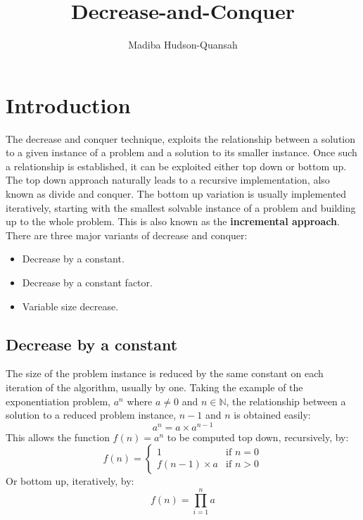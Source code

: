 \documentclass[12pt letter]{report}
\title{\Huge{Decrease-and-Conquer}}
\author{\huge{Madiba Hudson-Quansah}}
\date{}
\begin{document}
\maketitle
\newpage
{}
\tableofcontents
\pagebreak

\chapter{Introduction}

The decrease and conquer technique, exploits the relationship between a solution to a given instance of a problem and a
solution to its smaller instance. Once such a relationship is established, it can be exploited either top down or bottom
up. The top down approach naturally leads to a recursive implementation, also known as divide and conquer. The bottom up
variation is usually implemented iteratively, starting with the smallest solvable instance of a problem and building up
to the whole problem. This is also known as the \textbf{incremental approach}. There are three major variants of
decrease and conquer:
\begin{itemize}
  \item Decrease by a constant.
  \item Decrease by a constant factor.
  \item Variable size decrease.
\end{itemize}

\section{Decrease by a constant}

The size of the problem instance is reduced by the same constant on each iteration of the algorithm, usually by one.
Taking the example of the exponentiation problem, $a^{n}$ where $a \neq 0$ and $n \in \mathbb{N}$, the relationship
between a solution to a reduced problem instance, $n - 1$ and $n$ is obtained easily:
\[
  a^{n} = a \times a^{n-1}
\]
This allows the function $f \left( n \right) = a^{n} $ to be computed top down, recursively, by:
\[
  f \left( n \right) = \begin{cases}
    1                               & \text{if } n = 0 \\
    f \left( n -1  \right) \times a & \text{if } n > 0
  \end{cases}
\]
Or bottom up, iteratively, by:
\[
  f \left( n \right) = \prod_{i = 1}^{n} a
\]
\end{document}
